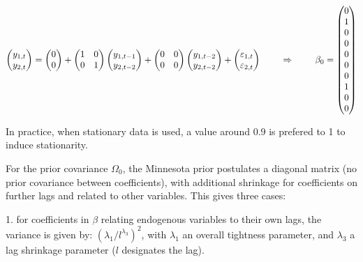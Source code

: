 \begin{equation}
\left( \begin{matrix} y_{1,t} \\ y_{2,t} \end{matrix} \right) = 
\left( \begin{matrix} 0 \\ 0 \end{matrix} \right) 
+ \left( \begin{matrix} 1 & 0 \\ 0 & 1 \end{matrix} \right) \left( \begin{matrix} y_{1,t-1} \\ y_{2,t-2} \end{matrix} \right) 
+ \left( \begin{matrix} 0 & 0 \\ 0 & 0 \end{matrix} \right) \left( \begin{matrix} y_{1,t-2} \\ y_{2,t-2} \end{matrix} \right) 
+ \left( \begin{matrix} \varepsilon_{1,t} \\ \varepsilon_{2,t} \end{matrix} \right) \hspace{8mm}
\Rightarrow \hspace{8mm} \beta_0 = \left( \begin{matrix} 0 \\ 1 \\ 0 \\ 0 \\ 0 \\ 0 \\ 0 \\ 1 \\ 0 \\ 0 \end{matrix} \right)
\label{equation_c3_s5_4}
\end{equation}

In practice, when stationary data is used, a value around 0.9 is prefered to 1 to induce stationarity.

For the prior covariance $\Omega_0$, the Minnesota prior postulates a diagonal matrix (no prior covariance between coefficients), with additional shrinkage for coefficients on further lags and related to other variables. This gives three cases:

1. for coefficients in $\beta$ relating endogenous variables to their own lags, the variance is given by: $(\lambda_1 / l^{\lambda_3})^2$, with $\lambda_1$ an overall tightness parameter, and $\lambda_3$ a lag shrinkage parameter ($l$ designates the lag).

